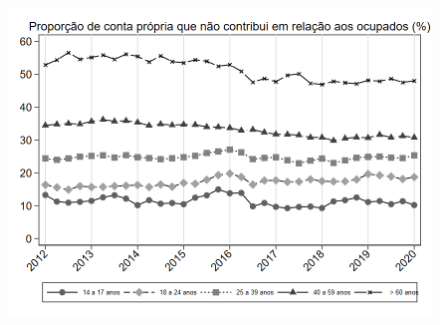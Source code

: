 \begin{frame}[label=_composicao_demografica_faixa_etaria_prop_cpropriaNc]{}
\textit{\hyperlink{_composicao_demografica_faixa_etaria}{}}
\begin{figure}
  \centering
  \includegraphics[width=1.0\linewidth]{../../analysis/output/composicao_demografica/faixa_etaria/_composicao_demografica_faixa_etaria_prop_cpropriaNc.png}
  \caption{}
  \label{fig:_composicao_demografica_faixa_etaria_prop_cpropriaNc}
\end{figure}
\end{frame}